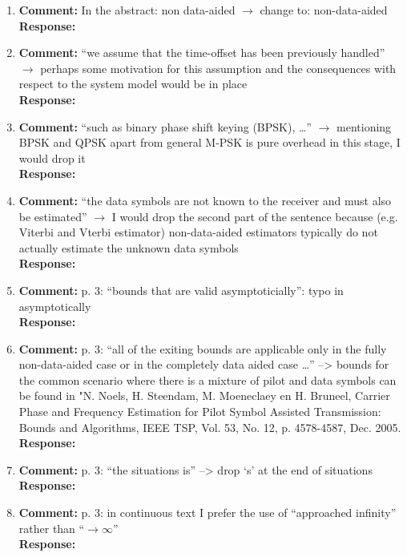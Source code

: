 \documentclass{article}
\begin{document}
\begin{enumerate}

\item \textbf{Comment:} In the abstract: non data-aided $\to$ change to: non-data-aided \\
\textbf{Response:}

\item \textbf{Comment:} ``we assume that the time-offset has been previously handled'' $\to$ perhaps some motivation for this assumption and the consequences with respect to the system model would be in place \\
\textbf{Response:}

\item \textbf{Comment:} ``such as binary phase shift keying (BPSK), \dots'' $\to$ mentioning BPSK and QPSK apart from general M-PSK is pure overhead in this stage, I would drop it \\
\textbf{Response:}

\item \textbf{Comment:} ``the data symbols are not known to the receiver and must also be estimated'' $\to$ I would drop the second part of the sentence because (e.g. Viterbi and Vterbi estimator) non-data-aided estimators typically do not actually estimate the unknown data symbols \\
\textbf{Response:}

\item \textbf{Comment:} p. 3: ``bounds that are valid asymptoticially'': typo in asymptotically \\
\textbf{Response:}

\item \textbf{Comment:} p. 3: ``all of the exiting bounds are applicable only in the fully non-data-aided case or in the completely data aided case \dots'' --> bounds for the common scenario where there is a mixture of pilot and data symbols can be found in "N. Noels, H. Steendam, M. Moeneclaey en H. Bruneel, Carrier Phase and Frequency Estimation for Pilot Symbol Assisted Transmission: Bounds and Algorithms, IEEE TSP, Vol. 53, No. 12, p. 4578-4587, Dec. 2005. \\
\textbf{Response:}

\item \textbf{Comment:} p. 3: ``the situations is'' --> drop `s' at the end of situations \\
\textbf{Response:}

\item \textbf{Comment:} p. 3: in continuous text I prefer the use of ``approached infinity'' rather than ``$\to \infty$'' \\
\textbf{Response:}


\end{enumerate}
\end{document}
